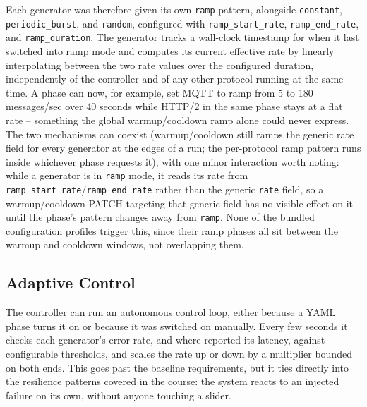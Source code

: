 Each generator was therefore given its own \texttt{ramp} pattern, alongside
\texttt{constant}, \texttt{periodic\_burst}, and \texttt{random}, configured
with \texttt{ramp\_start\_rate}, \texttt{ramp\_end\_rate}, and
\texttt{ramp\_duration}. The generator tracks a wall-clock timestamp for when
it last switched into ramp mode and computes its current effective rate by
linearly interpolating between the two rate values over the configured
duration, independently of the controller and of any other protocol running
at the same time. A phase can now, for example, set MQTT to ramp from 5 to
180 messages/sec over 40 seconds while HTTP/2 in the same phase stays at a
flat rate -- something the global warmup/cooldown ramp alone could never
express. The two mechanisms can coexist (warmup/cooldown still ramps the
generic rate field for every generator at the edges of a run; the per-protocol
ramp pattern runs inside whichever phase requests it), with one minor
interaction worth noting: while a generator is in \texttt{ramp} mode, it
reads its rate from \texttt{ramp\_start\_rate}/\texttt{ramp\_end\_rate}
rather than the generic \texttt{rate} field, so a warmup/cooldown PATCH
targeting that generic field has no visible effect on it until the phase's
pattern changes away from \texttt{ramp}. None of the bundled configuration
profiles trigger this, since their ramp phases all sit between the warmup
and cooldown windows, not overlapping them.

\subsection{Adaptive Control}

The controller can run an autonomous control loop, either because a YAML
phase turns it on or because it was switched on manually. Every few seconds it
checks each generator's error rate, and where reported its latency, against
configurable thresholds, and scales the rate up or down by a multiplier
bounded on both ends. This goes past the baseline requirements, but it ties
directly into the resilience patterns covered in the course: the system reacts
to an injected failure on its own, without anyone touching a slider.
